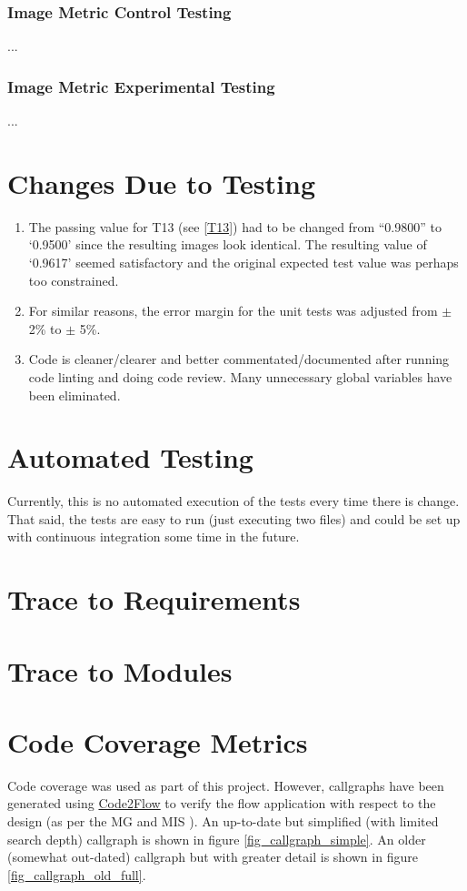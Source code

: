 \documentclass[12pt, titlepage]{article}
\begin{document}
\subsubsection{Image Metric Control Testing}
...
\subsubsection{Image Metric Experimental Testing}
...

\section{Changes Due to Testing}
\begin{enumerate}
  \item The passing value for T13 (see \ref{T13}) had to be changed from ``0.9800'' to `0.9500' since the
    resulting images look identical. The resulting value of `0.9617' seemed satisfactory and the original
    expected test value was perhaps too constrained.
  \item For similar reasons, the error margin for the unit tests was adjusted from $\pm$ 2\% to $\pm$ 5\%.
  \item Code is cleaner/clearer and better commentated/documented after running code linting and
    doing code review. Many unnecessary global variables have been eliminated.
\end{enumerate}


\section{Automated Testing}
Currently, this is no automated execution of the tests every time there is change.
That said, the tests are easy to run (just executing two files) and could be set up with
continuous integration some time in the future.

\section{Trace to Requirements}
		
\section{Trace to Modules}		

\section{Code Coverage Metrics}
Code coverage was used as part of this project. However, callgraphs have been generated using
\href{https://github.com/scottrogowski/code2flow}{Code2Flow}
to verify the flow application with respect to the design (as per the MG \cite{MG} and MIS \cite{MIS}).
An up-to-date but simplified (with limited search depth) callgraph is shown in figure \ref{fig_callgraph_simple}.
An older (somewhat out-dated) callgraph but with greater detail is shown in figure \ref{fig_callgraph_old_full}.
\end{document}
